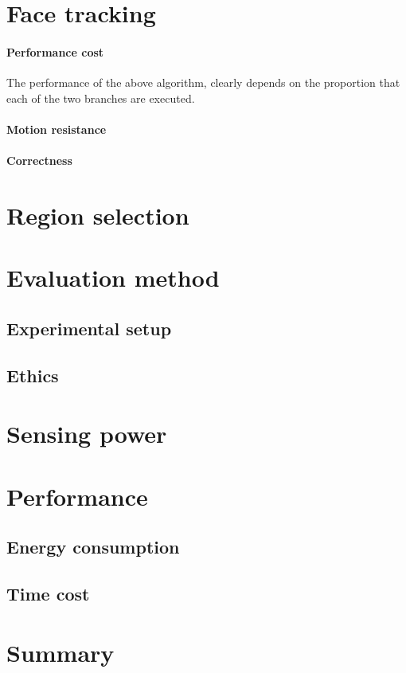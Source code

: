 \section{Face tracking}
\label{section:face_tracking}
\paragraph{Performance cost}
The performance of the above algorithm, clearly depends on the proportion that each of the two branches are executed.
\paragraph{Motion resistance}

\paragraph{Correctness}

\section{Region selection}
\label{section:region_selection}

\section{Evaluation method}
\subsection{Experimental setup}
\subsection{Ethics}

\section{Sensing power}
\section{Performance}
\subsection{Energy consumption}
\subsection{Time cost}
\section{Summary}